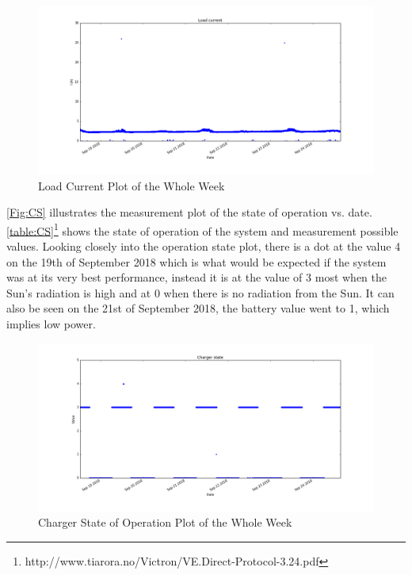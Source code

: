 \documentclass[12pt,a4paper]{report}
\begin{document}
\begin{figure}[h!]
	\begin{center}
		\includegraphics[width=1\linewidth]{Figures/IL.png}
		\caption{Load Current Plot of the Whole Week}
		\label{Fig:IL}
	\end{center}
\end{figure}

\autoref{Fig:CS} illustrates the measurement plot of the state of operation vs. date. \autoref{table:CS}\footnote{http://www.tiarora.no/Victron/VE.Direct-Protocol-3.24.pdf} shows the state of operation of the system and measurement possible values. Looking closely into the operation state plot, there is a dot at the value 4 on the 19th of September 2018 which is what would be expected if the system was at its very best performance, instead it is at the value of 3 most when the Sun's radiation is high and at 0 when there is no radiation from the Sun. It can also be seen on the 21st of September 2018, the battery value went to 1, which implies low power.

\begin{figure}[h!]
	\begin{center}
		\includegraphics[width=1\linewidth]{Figures/CS.png}
		\caption{Charger State of Operation Plot of the Whole Week}
		\label{Fig:CS}
	\end{center}
\end{figure}
\end{document}
